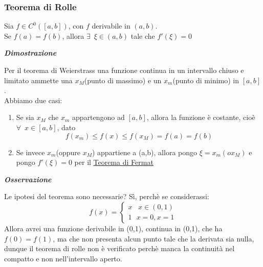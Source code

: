 \documentclass{article}
\theoremstyle{definition}
\begin{document}
    \subsubsection{Teorema di Rolle}
Sia $f \in C^0([a,b])$, con $f$ derivabile in $(a,b)$.
\\
Se $f(a)=f(b)$, allora $\exists \,\,\, \xi \in (a,b)$ tale che $f'(\xi)=0$
\begin{center}
    \textbf{\textit{Dimostrazione}}
\end{center}
Per il teorema di Weierstrass una funzione continua in un intervallo chiuso e limitato ammette una $x_M$(punto di massimo) e un $x_m$(punto di minimo) in $[a,b]$.
\\
Abbiamo due casi:
\begin{enumerate}
    \item Se sia $x_M$ che $x_m$ appartengono ad $[a,b]$, allora la funzione è costante, cioè $\forall \,\,\, x \in [a,b]$, dato
    \begin{equation*}
        f(x_m) \leqslant f(x) \leqslant f(x_M)=f(a)=f(b)
    \end{equation*}
    \item Se invece $x_m$(oppure $x_M$) appartiene a (a,b), allora pongo $\xi=x_m(o x_M)$ e pongo $f'(\xi)=0$ per il \underline{Teorema di Fermat}
\end{enumerate}
\begin{center}
\textbf{\textit{Osservazione}}
\end{center}
Le ipotesi del teorema sono necessarie? Sì, perchè se considerassi:
\begin{equation}
    f(x)=\begin{cases}
        x \,\,\,\,\, x \in (0,1) \\
        1 \,\,\,\, x=0, x=1
    \end{cases}
\end{equation}
Allora avrei una funzione derivabile in (0,1), continua in (0,1), che ha $f(0)=f(1)$, ma che non presenta alcun punto tale che la derivata sia nulla, dunque il teorema di rolle non è verificato perchè manca la continuità nel compatto e non nell'intervallo aperto.
\end{document}
